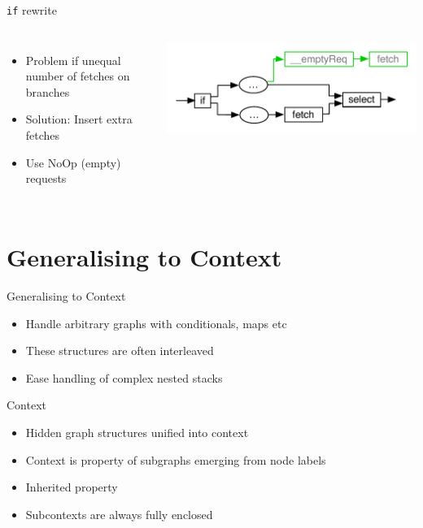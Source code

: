 \documentclass[utf8x,10pt,aspectratio=169]{beamer}
\begin{document}
\begin{frame}{\texttt{if} rewrite}
	\begin{columns}
		\begin{itemize}
			\item Problem if unequal number of fetches on branches
			\item Solution: Insert extra fetches
			\item Use NoOp (empty) requests
		\end{itemize}
		\includegraphics[width=\textwidth]{graphs/insert-empty-fetches-inserted}
	\end{columns}
\end{frame}
\section{Generalising to Context}
\begin{frame}{Generalising to Context}
	\begin{itemize}[<+->]
		\item Handle arbitrary graphs with conditionals, maps etc
		\item These structures are often interleaved
		\item Ease handling of complex nested stacks
	\end{itemize}
\end{frame}

\begin{frame}{Context}
	\begin{itemize}[<+->]
		
		\item Hidden graph structures unified into context
		\item Context is property of subgraphs emerging from node labels
		\item Inherited property
		\item Subcontexts are always fully enclosed
			
	\end{itemize}
\end{frame}
\end{document}
